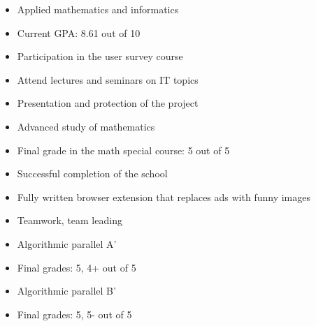 \documentclass[10pt,a4paper,ragged2e]{maltacv}
\begin{document}
\medskip
\begin{multicols}{2}

  \begin{itemize}
      \item Applied mathematics and informatics
      \item Current GPA: 8.61 out of 10
  \end{itemize}

  \begin{itemize}
      \item Participation in the user survey course
      \item Attend lectures and seminars on IT topics
      \item Presentation and protection of the project
  \end{itemize}
  
  \begin{itemize}
      \item Advanced study of mathematics
      \item Final grade in the math special course: 5 out of 5
  \end{itemize}
\columnbreak
  
  \begin{itemize}
        \item Successful completion of the school
        \item Fully written browser extension that replaces ads with funny images
        \item Teamwork, team leading
  \end{itemize}
  
  
  \begin{itemize}
        \item Algorithmic parallel A'
        \item Final grades: 5, 4+ out of 5
  \end{itemize}
  

  
  
  \begin{itemize}
        \item Algorithmic parallel B'
        \item Final grades: 5, 5- out of 5
  \end{itemize}
  
  
\end{multicols}
\end{document}
